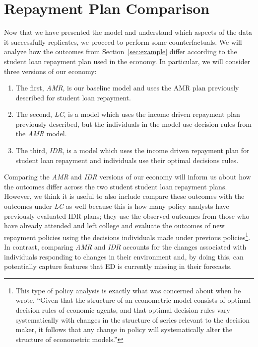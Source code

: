 
\section{Repayment Plan Comparison} \label{sec:results}

Now that we have presented the model and understand which aspects of the data it successfully
replicates, we proceed to perform some counterfactuals. We will analyze how the outcomes from
Section~\ref{sec:example} differ according to the student loan repayment plan used in the economy.
In particular, we will consider three versions of our economy:

\begin{enumerate}
  \item The first, \textit{AMR}, is our baseline model and uses the AMR plan
        previously described for student loan repayment.
  \item The second, \textit{LC}, is a model which uses the income driven repayment
        plan previously described, but the individuals in the model use decision rules from the
        \textit{AMR} model.
  \item The third, \textit{IDR}, is a model which uses the income driven repayment plan for student
        loan repayment and individuals use their optimal decisions rules.
\end{enumerate}

Comparing the \textit{AMR} and \textit{IDR} versions of our economy will inform us about how the
outcomes differ across the two student student loan repayment plans. However, we think it is useful
to also include compare these outcomes with the outcomes under \textit{LC} as well because this is
how many policy analysts have previously evaluated IDR plans; they use the observed outcomes from
those who have already attended and left college and evaluate the outcomes of new repayment policies
using the decisions individuals made under previous policies\footnote{This type of policy analysis
is exactly what \cite{Lucas1976} was concerned about when he wrote, ``Given that the structure of an
econometric model consists of optimal decision rules of economic agents, and that optimal decision
rules vary systematically with changes in the structure of series relevant to the decision maker, it
follows that any change in policy will systematically alter the structure of econometric models.''}.
In contrast, comparing \textit{AMR} and \textit{IDR} accounts for the changes associated with
individuals responding to changes in their environment and, by doing this, can potentially capture
features that ED is currently missing in their forecasts.

